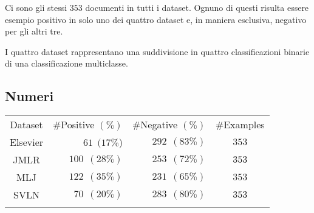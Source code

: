  
Ci sono gli stessi $353$ documenti in tutti i dataset. Ognuno di questi risulta essere esempio positivo in solo uno dei quattro dataset e, in maniera esclusiva, negativo per gli altri tre.

I quattro dataset rappresentano una suddivisione in quattro classificazioni binarie di una classificazione multiclasse.


\subsection{Numeri}

\begin{table}[htbp]
	\label{tab:datasets}
	\centering
\begin{tabular}{c@{\qquad}r@{\qquad}r@{\qquad}c}
\toprule
\addlinespace
Dataset & \#Positive $(\%)$ & \#Negative $(\%)$ & \#Examples \\
\addlinespace
\midrule
\addlinespace
Elsevier & $61~~(17\%$) & $292~~(83\%)$ & $353$ \\
JMLR     & $100~~(28\%)$ & $253~~(72\%)$ & $353$ \\
MLJ      & $122~~(35\%)$ & $231~~(65\%)$ & $353$ \\
SVLN     & $70~~(20\%)$ & $283~~(80\%)$ & $353$ \\
\addlinespace
\bottomrule
\end{tabular}
\end{table}

